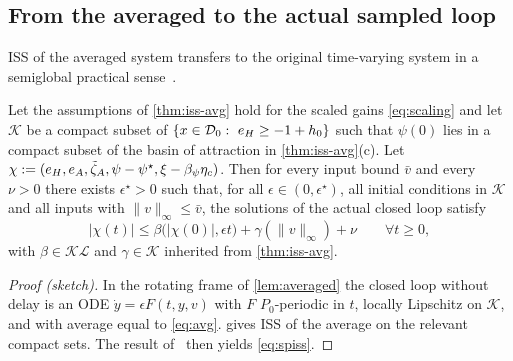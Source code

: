 \subsection{From the averaged to the actual sampled loop}
ISS of the averaged system transfers to the original time-varying system in a
semiglobal practical sense~\citep{nesic2001input,teel2003unified}.

\begin{theorem}\label{thm:spiss}
Let the assumptions of \cref{thm:iss-avg} hold for the scaled gains
\eqref{eq:scaling} and let $\mathcal K$ be a compact subset of
$\{x\in\mathcal D_0:\ \eH\ge-1+h_0\}$ such that $\psi(0)$ lies in a compact
subset of the basin of attraction in \cref{thm:iss-avg}(c).
Let $\chi:=(e_H,e_A,\tilde\zeta_A,\psi-\psi^\star,\xi-\beta_\psi\eta_c)$.
Then for every input bound $\bar v$ and every $\nu>0$ there exists
$\epsilon^\star>0$ such that, for all $\epsilon\in(0,\epsilon^\star)$, all
initial conditions in $\mathcal K$ and all inputs with $\|v\|_\infty\le\bar v$,
the solutions of the actual closed loop satisfy
\begin{equation}\label{eq:spiss}
  |\chi(t)|\le\beta\big(|\chi(0)|,\epsilon t\big)+\gamma(\|v\|_\infty)+\nu
  \qquad\forall t\ge0,
\end{equation}
with $\beta\in\mathcal{KL}$ and $\gamma\in\mathcal K$ inherited from
\cref{thm:iss-avg}.
\end{theorem}

\begin{proof}[Proof (sketch)]
In the rotating frame of \cref{lem:averaged} the closed loop without delay is an
ODE $\dot y=\epsilon F(t,y,v)$ with $F$ $P_0$-periodic in $t$, locally Lipschitz
on $\mathcal K$, and with average equal to \eqref{eq:avg}.
 gives ISS of the average on the relevant compact sets.
The result of~\citet[Thm.~2]{nesic2001input} then yields \eqref{eq:spiss}.
\end{proof}

